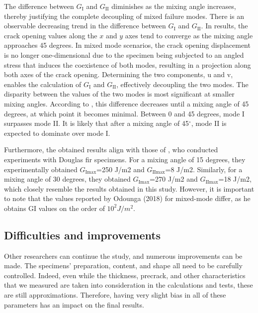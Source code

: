The difference between $G_\text{I}$ and $G_\text{II}$ diminishes as the mixing angle increases, thereby justifying the complete decoupling of mixed failure modes. There is an observable decreasing trend in the difference between $G_\text{I}$ and $G_\text{II}$.
In \citet{Odounga2018phd} results, the crack opening values along the $x$ and $y$ axes tend to converge as the mixing angle approaches 45 degrees. In mixed mode scenarios, the crack opening displacement is no longer one-dimensional due to the specimen being subjected to an angled stress that induces the coexistence of both modes, resulting in a projection along both axes of the crack opening. Determining the two components, u and v, enables the calculation of $G_\text{I}$ and $G_\text{II}$, effectively decoupling the two modes. The disparity between the values of the two modes is most significant at smaller mixing angles. According to \citet{Odounga2018phd}, this difference decreases until a mixing angle of 45 degrees, at which point it becomes minimal. Between 0 and 45 degrees, mode I surpasses mode II. It is likely that after a mixing angle of 45$^\circ$, mode II is expected to dominate over mode I.

Furthermore, the obtained results align with those of \citet{MoutouPitti2008}, who conducted experiments with Douglas fir specimens. For a mixing angle of 15 degrees, they experimentally obtained $G_\text{Imax}$=250 J/m2 and $G_\text{IImax}$=8 J/m2. Similarly, for a mixing angle of 30 degrees, they obtained $G_\text{Imax}$=270 J/m2 and $G_\text{IImax}$=18 J/m2, which closely resemble the results obtained in this study.
However, it is important to note that the values reported by Odounga (2018) for mixed-mode differ, as he obtains GI values on the order of $10^2 J/m^2$.

\subsection{Difficulties and improvements}

Other researchers can continue the study, and numerous improvements can be made. The specimens' preparation, content, and shape all need to be carefully controlled. Indeed, even while the thickness, precrack, and other characteristics that we measured are taken into consideration in the calculations and tests, these are still approximations. Therefore, having very slight bias in all of these parameters has an impact on the final results.

